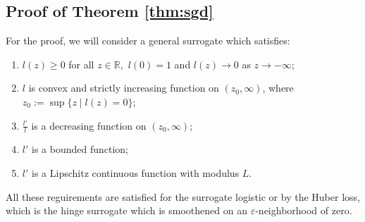 \documentclass[]{interact}
\theoremstyle{plain}%
\theoremstyle{definition}
\theoremstyle{remark}
\newcommand{\norm}[1]{\|#1\|}
\newcommand{\R}{{\mathbb R}}
\newcommand{\eps}{{\varepsilon}}
\begin{document}

\subsection{Proof of Theorem \ref{thm:sgd}}\label{app:sgd2}


For the proof, we will consider a general surrogate which satisfies:
\begin{enumerate}[label=(S\arabic*)]\itemsep 0pt
\item \label{surr_basic1} $l(z)\ge 0$ for all $z\in\R$,\ $l(0)=1$ and $l(z)\to 0$ as $z\to-\infty$;
\item \label{surr_basic2} $l$ is convex and strictly increasing function on $(z_0,\infty)$, where $z_0:=\sup\{z\mid l(z)=0\}$;
\item \label{surr_ratio} $\frac{l'}{l}$ is a decreasing function on $(z_0,\infty)$;
\item \label{surr_der1} $l'$ is a bounded function;
\item \label{surr_der2} $l'$ is a Lipschitz continuous function with modulus $L$.
\end{enumerate}
All these reguirements are satisfied for the surrogate logistic or by the Huber loss, which is the hinge surrogate which is smoothened on an $\eps$-neighborhood of zero.

\vspace{2mm}
\end{document}
